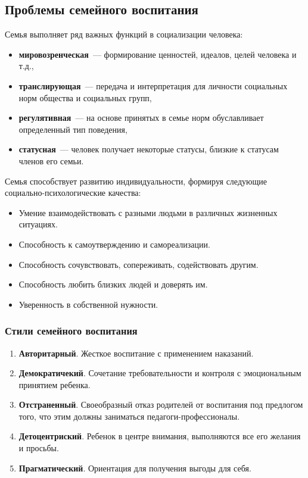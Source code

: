 \subsection{Проблемы семейного воспитания}
Семья выполняет ряд важных функций в социализации человека:
\begin{itemize}
	\item \textbf{мировозренческая}~--- формирование ценностей, идеалов, целей человека и т.д.,
	\item \textbf{транслирующая}~--- передача и интерпретация для личности социальных норм общества и социальных групп,
	\item \textbf{регулятивная}~--- на основе принятых в семье норм обуславливает определенный тип поведения,
	\item \textbf{статусная}~--- человек получает некоторые статусы, близкие к статусам членов его семьи.
\end{itemize}
Семья способствует развитию индивидуальности, формируя следующие социально-психологические качества:
\begin{itemize}
	\item Умение взаимодействовать с разными людьми в различных жизненных ситуациях.
	\item Способность к самоутверждению и самореализации.
	\item Способность сочувствовать, сопереживать, содействовать другим.
	\item Способность любить близких людей и доверять им.
	\item Уверенность в собственной нужности.
\end{itemize}
\subsubsection{Стили семейного воспитания}
\begin{enumerate}
	\item \textbf{Авторитарный}. Жесткое воспитание с применением наказаний.
	\item \textbf{Демократичекий}. Сочетание требовательности и контроля с эмоциональным принятием ребенка.
	\item \textbf{Отстраненный}. Своеобразный отказ родителей от воспитания под предлогом того, что этим должны заниматься педагоги-профессионалы.
	\item \textbf{Детоцентриский}. Ребенок в центре внимания, выполняются все его желания и просьбы.
	\item \textbf{Прагматический}. Ориентация для получения выгоды для себя.
\end{enumerate}

